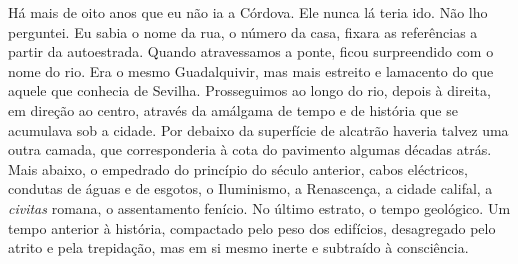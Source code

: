 Há mais de oito anos que eu não ia a Córdova. Ele nunca lá teria ido.
Não lho perguntei. Eu sabia o nome da rua, o número da casa, fixara as
referências a partir da autoestrada. Quando atravessamos a ponte,
ficou surpreendido com o nome do rio. Era o mesmo Guadalquivir, mas mais
estreito e lamacento do que aquele que conhecia de Sevilha. Prosseguimos
ao longo do rio, depois à direita, em direção ao centro, através da
amálgama de tempo e de história que se acumulava sob a cidade. Por
debaixo da superfície de alcatrão haveria talvez uma outra camada, que
corresponderia à cota do pavimento algumas décadas atrás. Mais abaixo, o
empedrado do princípio do século anterior, cabos eléctricos, condutas de
águas e de esgotos, o Iluminismo, a Renascença, a cidade califal, a
\emph{civitas} romana, o assentamento fenício. No último estrato, o
tempo geológico. Um tempo anterior à história, compactado pelo peso dos
edifícios, desagregado pelo atrito e pela trepidação, mas em si mesmo
inerte e subtraído à consciência.

